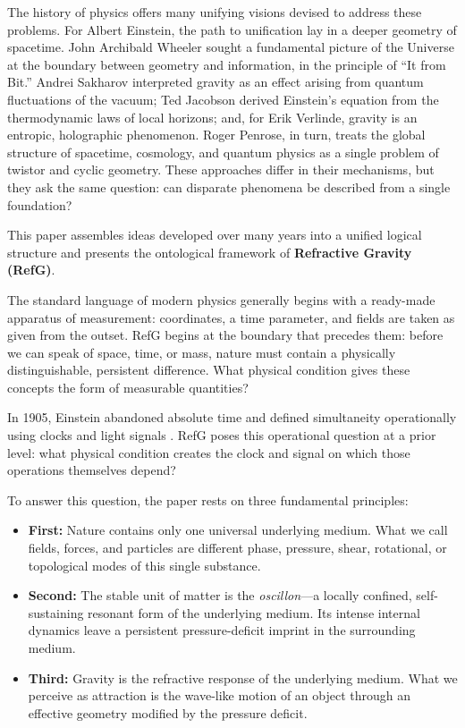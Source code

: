 \documentclass[11pt,a4paper]{article}
\begin{document}
The history of physics offers many unifying visions devised to address these problems. For Albert Einstein, the path to unification lay in a deeper geometry of spacetime. John Archibald Wheeler sought a fundamental picture of the Universe at the boundary between geometry and information, in the principle of ``It from Bit.'' Andrei Sakharov interpreted gravity as an effect arising from quantum fluctuations of the vacuum; Ted Jacobson derived Einstein's equation from the thermodynamic laws of local horizons; and, for Erik Verlinde, gravity is an entropic, holographic phenomenon. Roger Penrose, in turn, treats the global structure of spacetime, cosmology, and quantum physics as a single problem of twistor and cyclic geometry. These approaches differ in their mechanisms, but they ask the same question: can disparate phenomena be described from a single foundation?

This paper assembles ideas developed over many years into a unified logical structure and presents the ontological framework of \textbf{Refractive Gravity (RefG)}.

The standard language of modern physics generally begins with a ready-made apparatus of measurement: coordinates, a time parameter, and fields are taken as given from the outset. RefG begins at the boundary that precedes them: before we can speak of space, time, or mass, nature must contain a physically distinguishable, persistent difference. What physical condition gives these concepts the form of measurable quantities?

In 1905, Einstein abandoned absolute time and defined simultaneity operationally using clocks and light signals \citep{einstein1905}. RefG poses this operational question at a prior level: what physical condition creates the clock and signal on which those operations themselves depend?

To answer this question, the paper rests on three fundamental principles:

\begin{itemize}
\item \textbf{First:} Nature contains only one universal underlying medium. What we call fields, forces, and particles are different phase, pressure, shear, rotational, or topological modes of this single substance.
\item \textbf{Second:} The stable unit of matter is the \emph{oscillon}---a locally confined, self-sustaining resonant form of the underlying medium. Its intense internal dynamics leave a persistent pressure-deficit imprint in the surrounding medium.
\item \textbf{Third:} Gravity is the refractive response of the underlying medium. What we perceive as attraction is the wave-like motion of an object through an effective geometry modified by the pressure deficit.
\end{itemize}
\end{document}
